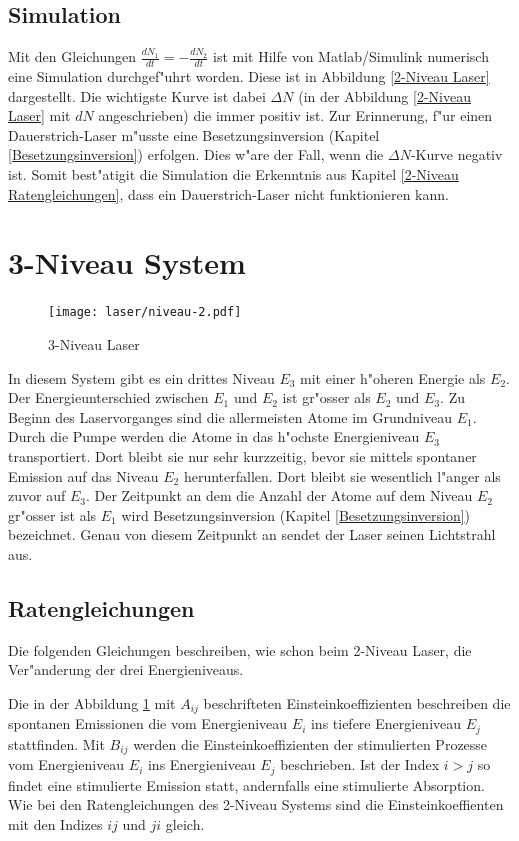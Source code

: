 \begin{refsection}
\subsection{Simulation
\label{2-Niveau System Simulation}}
Mit den Gleichungen  $\frac{dN_1}{dt} = -\frac{dN_2}{dt}$ ist mit Hilfe von
Matlab/Simulink numerisch eine Simulation durchgef"uhrt worden.
Diese ist in Abbildung \ref{2-Niveau Laser}  dargestellt.
Die wichtigste Kurve ist dabei $\Delta N $ 
(in der Abbildung \ref{2-Niveau Laser} mit $dN$ angeschrieben)
die immer positiv ist.
Zur Erinnerung, f"ur einen Dauerstrich-Laser m"usste eine Besetzungsinversion
(Kapitel \ref{Besetzungsinversion}) erfolgen.
Dies w"are der Fall, wenn die $\Delta N $-Kurve negativ ist.
Somit best"atigit die Simulation die Erkenntnis aus Kapitel
\ref{2-Niveau Ratengleichungen}, dass ein Dauerstrich-Laser nicht
funktionieren kann.

\section{3-Niveau System
\label{3-Niveau System}}

\begin{figure}
\centering
\texttt{[image: laser/niveau-2.pdf]}
\caption{3-Niveau Laser}
\label{3-Niveau Laser}
\end{figure}

In diesem System gibt es ein drittes Niveau $E_3$ mit einer h"oheren Energie
als $E_2$. 
Der Energieunterschied zwischen $E_1$ und $E_2$ ist gr"osser 
als $E_2$ und $E_3$.
Zu Beginn des Laservorganges sind die allermeisten Atome im Grundniveau $E_1$.
Durch die Pumpe werden die Atome in das h"ochste Energieniveau $E_3$
transportiert.
Dort bleibt sie nur sehr kurzzeitig, bevor sie mittels spontaner Emission auf das
Niveau $E_2$ herunterfallen.
Dort bleibt sie wesentlich l"anger als zuvor auf $E_3$.
Der Zeitpunkt an dem die Anzahl der Atome auf dem Niveau $E_2$ gr"osser ist als
$E_1$ wird Besetzungsinversion (Kapitel \ref{Besetzungsinversion}) bezeichnet.
Genau von diesem Zeitpunkt an sendet der Laser seinen Lichtstrahl aus.

\subsection{Ratengleichungen}
\label{3-Niveau Ratengleichungen}
Die folgenden Gleichungen  beschreiben, wie schon beim 2-Niveau Laser, die
Ver"anderung der drei Energieniveaus.

Die in der Abbildung \ref{3-Niveau Laser} mit $A_{ij}$ beschrifteten
Einsteinkoeffizienten beschreiben die spontanen Emissionen die vom
Energieniveau $E_i$ ins tiefere Energieniveau $E_j$ stattfinden.
Mit $B_{ij}$ werden die Einsteinkoeffizienten der stimulierten Prozesse
vom Energieniveau $E_i$ ins Energieniveau $E_j$ beschrieben. 
Ist der Index $i > j$ so findet eine stimulierte Emission statt,
andernfalls eine stimulierte Absorption.
Wie bei den Ratengleichungen des 2-Niveau Systems sind die Einsteinkoeffienten
mit den Indizes $ij$ und $ji$ gleich.



\end{refsection}
